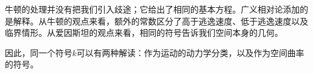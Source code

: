 牛顿的处理并没有把我们引入歧途；它给出了相同的基本方程。广义相对论添加的是解释。从牛顿的观点来看，额外的常数区分了高于逃逸速度、低于逃逸速度以及临界情形。从爱因斯坦的观点来看，相同的符号告诉我们空间本身的几何。

\begin{classroomqa}
\end{classroomqa}

因此，同一个符号\(k\)可以有两种解读：作为运动的动力学分类，以及作为空间曲率的符号。
